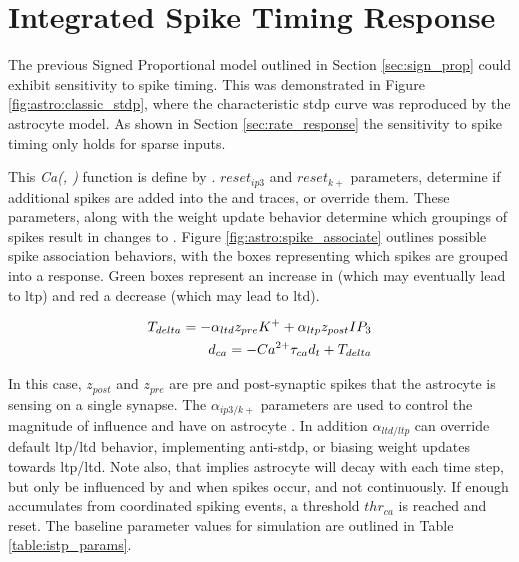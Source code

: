 \section{Integrated Spike Timing Response} \label{section:istp}
 The previous Signed Proportional model outlined in Section
\ref{sec:sign_prop} could exhibit sensitivity to spike timing. This was
demonstrated in Figure \ref{fig:astro:classic_stdp}, where the characteristic
\gls{stdp} curve was reproduced by the astrocyte model. As shown in Section
\ref{sec:rate_response} the sensitivity to spike timing only holds for sparse
inputs.

This \emph{Ca(\ipt, \kp)} function is define by . $reset_{ip3}$ and $reset_{k+}$ parameters, determine if
additional spikes are added into the \ipt and \kp traces, or override
them. These parameters, along with the weight update behavior determine which
groupings of spikes result in changes to \ca. Figure
\ref{fig:astro:spike_associate} outlines possible spike association
behaviors, with the boxes representing which spikes are grouped into a \ca
response. Green boxes represent an increase in \ca (which may eventually lead to
\gls{ltp}) and red a decrease (which may lead to \gls{ltd}).



\begin{align}
T_{delta} = -\alpha_{ltd} z_{pre} K^+ + \alpha_{ltp} z_{post} IP_3\\
d_{ca} = -Ca^{2+} \tau_{ca} d_t + T_{delta} \label{eq:astro:temp-u}
\end{align}

In this case, $z_{post}$ and $z_{pre}$ are pre and post-synaptic spikes that
the astrocyte is sensing on a single synapse. The $\alpha_{ip3/k+}$ parameters
are used to control the magnitude of influence \ipt and \kp have on astrocyte
\ca. In addition $\alpha_{ltd/ltp}$ can override default \gls{ltp}/\gls{ltd} behavior,
implementing anti-stdp, or biasing weight updates towards \gls{ltp}/\gls{ltd}. Note also,
that  implies astrocyte \ca will decay with each
time step, but only be influenced by \ipt and \kp when spikes occur, and
not continuously. If enough \ca accumulates from coordinated spiking events, a
threshold $thr_{ca}$ is reached and \ca reset. The baseline parameter values
for simulation are outlined in Table \ref{table:istp_params}.

